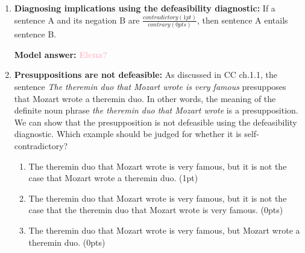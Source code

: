 \documentclass[a4,11pt]{article}
\newcommand{\jt}[1]{\textbf{\textcolor{Pink}{#1}}}
\begin{document}
\begin{enumerate}[leftmargin = 12pt]
{\bf Model answer:} The correct answer is {\em She has a good personality, and she is attractive}. In this example, sentence A is combined with the negation of B: {\em she is attractive} is a more natural way of saying {\em it is not the case that she is not attractive}. In the answer {\em She has a good personality, and it is not the case that she has a good personality},  sentence A is combined with its own negation! This does not serve to diagnose the type of implication that B is. In the answer {\em She has a good personality, and it is not the case that she is attractive}, sentence A is combined with the inference B: this also does not serve to diagnose the type of implication that B is: we already know that B is implied by A, i.e., sentence A is compatible with B, so we don't learn anything new by combining the two in this way.


\item {\bf Diagnosing implications using the defeasibility diagnostic:} If a sentence A and its negation B are  $\frac{contradictory (1pt)}{contrary (0pts)}$, then sentence A entails sentence B. 

 {\bf Model answer:} \jt{Elena?}
 
 
\item {\bf Presuppositions are not defeasible:} As discussed in CC ch.1.1, the sentence {\em The theremin duo that Mozart wrote is very famous} presupposes that Mozart wrote a theremin duo. In other words, the meaning of the definite noun phrase {\em the theremin duo that Mozart wrote} is a presupposition. We can show that the presupposition is not defeasible using the defeasibility diagnostic. Which example should be judged for whether it is self-contradictory?

   \begin{enumerate}[noitemsep]
        \item The theremin duo that Mozart wrote is very famous, but it is not the case that Mozart wrote a theremin duo. (1pt)
        \item The theremin duo that Mozart wrote is very famous, but it is not the case that the theremin duo that Mozart wrote is very famous. (0pts)
        \item The theremin duo that Mozart wrote is very famous, but Mozart wrote a theremin duo. (0pts)
    \end{enumerate}
    

\end{enumerate}
\end{document}
